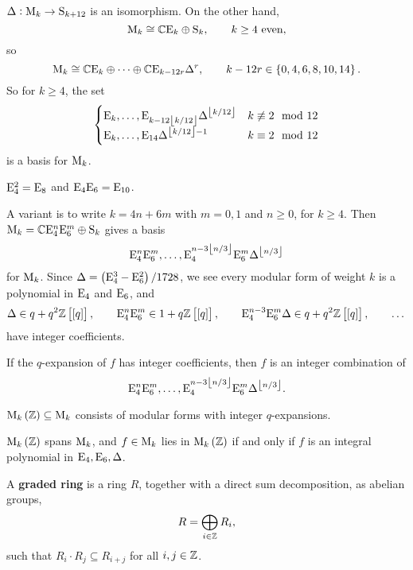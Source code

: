 \begin{corollary}
$ \Delta : \mathrm{M}_k \to \mathrm{S}_{k + 12} $ is an isomorphism. On the other hand,
$$ \mathrm{M}_k \cong \mathbb{C}\mathrm{E}_k \oplus \mathrm{S}_k, \qquad k \ge 4 \ \text{even}, $$
so
$$ \M_k \cong \CC\E_k \oplus \dots \oplus \CC\E_{k - 12r}\Delta^r, \qquad k - 12r \in \cbr{0, 4, 6, 8, 10, 14}. $$
So for $ k \ge 4 $, the set
$$
\begin{cases}
\mathrm{E}_k, \dots, \mathrm{E}_{k - 12\left\lfloor k / 12 \right\rfloor}\Delta^{\left\lfloor k / 12 \right\rfloor} & k \not\equiv 2 \mod 12 \\
\mathrm{E}_k, \dots, \mathrm{E}_{14}\Delta^{\left\lfloor k / 12 \right\rfloor - 1} & k \equiv 2 \mod 12
\end{cases}
$$
is a basis for $ \mathrm{M}_k $.
\end{corollary}

\begin{corollary}
$ \mathrm{E}_4^2 = \mathrm{E}_8 $ and $ \mathrm{E}_4\mathrm{E}_6 = \mathrm{E}_{10} $.
\end{corollary}


A variant is to write $ k = 4n + 6m $ with $ m = 0, 1 $ and $ n \ge 0 $, for $ k \ge 4 $. Then $ \mathrm{M}_k = \mathbb{C}\mathrm{E}_4^n\mathrm{E}_6^m \oplus \mathrm{S}_k $ gives a basis
$$ \mathrm{E}_4^n\mathrm{E}_6^m, \dots, \mathrm{E}_4^{n - 3\left\lfloor n / 3 \right\rfloor}\mathrm{E}_6^m\Delta^{\left\lfloor n / 3 \right\rfloor} $$
for $ \mathrm{M}_k $. Since $ \Delta = \br{\E_4^3 - \E_6^2} / 1728 $, we see every modular form of weight $ k $ is a polynomial in $ \mathrm{E}_4 $ and $ \mathrm{E}_6 $, and
$$ \Delta \in q + q^2\ZZ\sbr{\sbr{q}}, \qquad \E_4^n\E_6^m \in 1 + q\ZZ\sbr{\sbr{q}}, \qquad \E_4^{n - 3}\E_6^m\Delta \in q + q^2\ZZ\sbr{\sbr{q}}, \qquad \dots $$
have integer coefficients.

\begin{corollary}
If the $ q $-expansion of $ f $ has integer coefficients, then $ f $ is an integer combination of
$$ \mathrm{E}_4^n\mathrm{E}_6^m, \dots, \mathrm{E}_4^{n - 3\left\lfloor n / 3 \right\rfloor}\mathrm{E}_6^m\Delta^{\left\lfloor n / 3 \right\rfloor}. $$
\end{corollary}

\begin{notation*}
$ \M_k\br{\ZZ} \subseteq \M_k $ consists of modular forms with integer $ q $-expansions.
\end{notation*}

\begin{theorem}
$ \M_k\br{\ZZ} $ spans $ \mathrm{M}_k $, and $ f \in \mathrm{M}_k $ lies in $ \M_k\br{\ZZ} $ if and only if $ f $ is an integral polynomial in $ \mathrm{E}_4, \mathrm{E}_6, \Delta $.
\end{theorem}

\begin{definition}
A \textbf{graded ring} is a ring $ R $, together with a direct sum decomposition, as abelian groups,
$$ R = \bigoplus_{i \in \mathbb{Z}} R_i, $$
such that $ R_i \cdot R_j \subseteq R_{i + j} $ for all $ i, j \in \mathbb{Z} $.
\end{definition}

